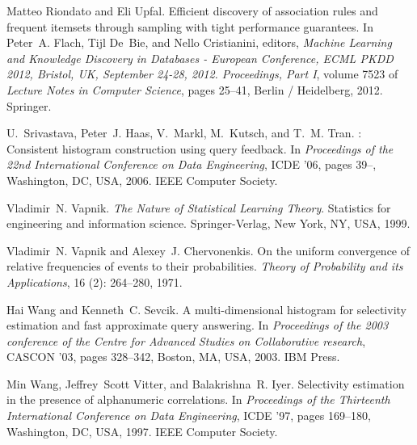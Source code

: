 \begin{thebibliography}{67}
Matteo Riondato and Eli Upfal.
\newblock Efficient discovery of association rules and frequent itemsets
  through sampling with tight performance guarantees.
\newblock In Peter~A. Flach, Tijl De~Bie, and Nello Cristianini, editors,
  \emph{Machine Learning and Knowledge Discovery in Databases - European
  Conference, ECML PKDD 2012, Bristol, UK, September 24-28, 2012. Proceedings,
  Part I}, volume 7523 of \emph{Lecture Notes in Computer Science}, pages
  25--41, Berlin / Heidelberg, 2012. Springer.

U.~Srivastava, Peter~J. Haas, V.~Markl, M.~Kutsch, and T.~M. Tran.
: Consistent histogram construction using query feedback.
\newblock In \emph{Proceedings of the 22nd International Conference on Data
  Engineering}, ICDE '06, pages 39--, Washington, DC, USA, 2006. IEEE Computer
  Society.

Vladimir~N. Vapnik.
\newblock \emph{The Nature of Statistical Learning Theory}.
\newblock Statistics for engineering and information science. Springer-Verlag,
  New York, NY, USA, 1999.

Vladimir~N. Vapnik and Alexey~J. Chervonenkis.
\newblock On the uniform convergence of relative frequencies of events to their
  probabilities.
\newblock \emph{Theory of Probability and its Applications}, 16
  (2): 264--280, 1971.

Hai Wang and Kenneth~C. Sevcik.
\newblock A multi-dimensional histogram for selectivity estimation and fast
  approximate query answering.
\newblock In \emph{Proceedings of the 2003 conference of the Centre for
  Advanced Studies on Collaborative research}, CASCON '03, pages 328--342,
  Boston, MA, USA, 2003. IBM Press.

Min Wang, Jeffrey~Scott Vitter, and Balakrishna~R. Iyer.
\newblock Selectivity estimation in the presence of alphanumeric correlations.
\newblock In \emph{Proceedings of the Thirteenth International Conference on
  Data Engineering}, ICDE '97, pages 169--180, Washington, DC, USA, 1997. IEEE
  Computer Society.


\end{thebibliography}
